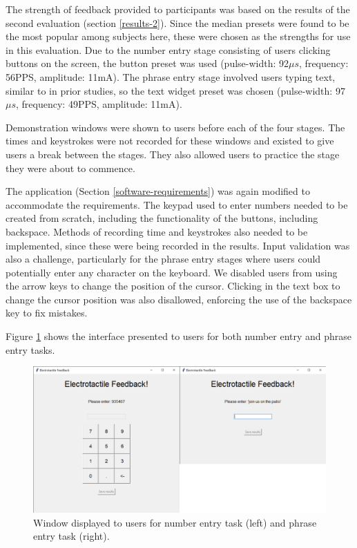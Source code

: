 \documentclass{mpaper}
\begin{document}
The strength of feedback provided to participants was based on the results of the second evaluation (section \ref{results-2}). Since the median presets were found to be the most popular among subjects here, these were chosen as the strengths for use in this evaluation. Due to the number entry stage consisting of users clicking buttons on the screen, the button preset was used (pulse-width: 92${\mu}s$, frequency: 56PPS, amplitude: 11mA). The phrase entry stage involved users typing text, similar to in prior studies, so the text widget preset was chosen (pulse-width: 97${\mu}s$, frequency: 49PPS, amplitude: 11mA).

Demonstration windows were shown to users before each of the four stages. The times and keystrokes were not recorded for these windows and existed to give users a break between the stages. They also allowed users to practice the stage they were about to commence.

The application (Section \ref{software-requirements}) was again modified to accommodate the requirements. The keypad used to enter numbers needed to be created from scratch, including the functionality of the buttons, including backspace. Methods of recording time and keystrokes also needed to be implemented, since these were being recorded in the results. Input validation was also a challenge, particularly for the phrase entry stages where users could potentially enter any character on the keyboard. We disabled users from using the arrow keys to change the position of the cursor. Clicking in the text box to change the cursor position was also disallowed, enforcing the use of the backspace key to fix mistakes.

Figure \ref{fig:gui-3} shows the interface presented to users for both number entry and phrase entry tasks.

\begin{figure}
    \centering
    \includegraphics[scale=0.08]{images/Electrotactile Feedback 11_03_2024 13_55_31.png}
    \caption{Window displayed to users for number entry task (left) and phrase entry task (right).}
    \label{fig:gui-3}
\end{figure}
\end{document}
